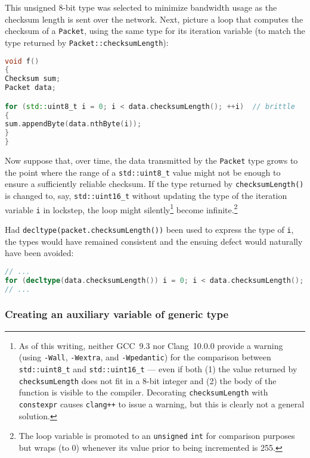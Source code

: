 \noindent This unsigned 8-bit type was selected to minimize bandwidth usage
as the checksum length is sent over the network. Next, picture a loop
that computes the checksum of a \lstinline!Packet!, using the same type for its iteration variable (to match the
type returned by \lstinline!Packet::checksumLength!):

\begin{lstlisting}[language=C++]
void f()
{
Checksum sum;
Packet data;

for (std::uint8_t i = 0; i < data.checksumLength(); ++i)  // brittle
{
sum.appendByte(data.nthByte(i));
}
}
\end{lstlisting}


Now suppose that, over time, the data transmitted by the \lstinline!Packet!
type grows to the point where the range of a \lstinline!std::uint8_t!
value might not be enough to ensure a sufficiently reliable checksum. If
the type returned by \lstinline!checksumLength()! is changed to, say,
\lstinline!std::uint16_t! without updating the type of the iteration
variable \lstinline!i! in lockstep, the loop might
silently{\cprotect\footnote{As of this writing, neither
GCC~9.3 nor Clang~10.0.0 provide
a warning (using \lstinline!-Wall!, \lstinline!-Wextra!, and
\lstinline!-Wpedantic!) for the comparison between \lstinline!std::uint8_t!
and \lstinline!std::uint16_t! --- even if both (1) the value returned by
\lstinline!checksumLength! does not fit in a 8-bit integer and (2) the
body of the function is visible to the compiler. Decorating
\lstinline!checksumLength! with \lstinline!constexpr! causes
\lstinline!clang++! to issue a warning, but this is clearly not a general
solution.}} become infinite.{\cprotect\footnote{The loop
variable is promoted to an \lstinline!unsigned! \lstinline!int! for
comparison purposes but wraps (to 0) whenever its value prior to
being incremented is 255.}}

Had \lstinline!decltype(packet.checksumLength())! been used to express the
type of \lstinline!i!, the types would have remained consistent and the
ensuing defect would naturally have been avoided:

\begin{lstlisting}[language=C++]
// ...
for (decltype(data.checksumLength()) i = 0; i < data.checksumLength(); ++i)
// ...
\end{lstlisting}


\subsubsection[Creating an auxiliary variable of generic type]{Creating an auxiliary variable of generic type}\label{creating-an-auxiliary-variable-of-generic-type}

